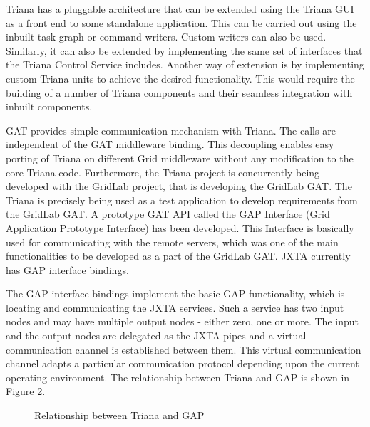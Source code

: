 \documentclass[9pt,twocolumn,twoside]{styles/osajnl}
\begin{document}
Triana has a pluggable architecture that can be extended using the 
Triana GUI as a front end to some standalone application. This can be 
carried out using the inbuilt task-graph or command writers. Custom 
writers can also be used. Similarly, it can also be extended by 
implementing the same set of interfaces that the Triana Control Service 
includes. Another way of extension is by implementing custom Triana 
units to achieve the desired functionality. This would require the 
building of a number of Triana components and their seamless integration 
with inbuilt components.

GAT provides simple communication mechanism with Triana. The calls are 
independent of the GAT middleware binding. This decoupling enables easy 
porting of Triana on different Grid middleware without any modification 
to the core Triana code. Furthermore, the Triana project is concurrently 
being developed with the GridLab project, that is developing the GridLab 
GAT. The Triana is precisely being used as a test application to develop 
requirements from the GridLab GAT. A prototype GAT API called the GAP 
Interface (Grid Application Prototype Interface) has been developed. 
This Interface is basically used for communicating with the remote 
servers, which was one of the main functionalities to be developed as a 
part of the GridLab GAT. JXTA currently has GAP interface bindings. 

The GAP interface bindings implement the basic GAP functionality,
which is locating and communicating the JXTA services. Such a service
has two input nodes and may have multiple output nodes - either zero,
one or more. The input and the output nodes are delegated as the JXTA
pipes and a virtual communication channel is established between
them. This virtual communication channel adapts a particular
communication protocol depending upon the current operating
environment. The relationship between Triana and GAP is shown in
Figure 2.

\begin{figure}[htbp]
  \centering
  \caption{Relationship between Triana and GAP \cite{TrianaDocumentation1}}
\end{figure}
\end{document}
